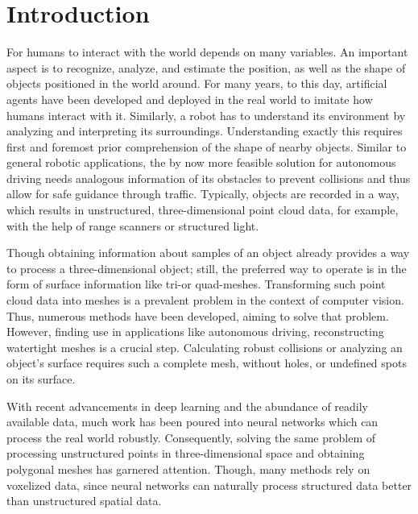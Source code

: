 
\chapter{Introduction}
  For humans to interact with the world depends on many variables. 
  An important aspect is to recognize, analyze, and estimate the position,
  as well as the shape of objects positioned in the world around. For many years,
  to this day, artificial agents have been developed and deployed in the real world\cite{1087032,10.1007978-981-13-0224-4_40} 
  to imitate how humans interact with it. Similarly, a robot has to understand its environment
  by analyzing and interpreting its surroundings. Understanding exactly this requires first and 
  foremost prior comprehension of the shape of nearby objects. 
  Similar to general robotic applications, the by now more feasible solution for autonomous driving
  needs analogous information of its obstacles to prevent collisions and thus allow for safe guidance
  through traffic. 
  Typically, objects are recorded in a way, which results in unstructured, three-dimensional point
  cloud data, for example, with the help of range scanners or structured light.


  Though obtaining information about samples of an object already provides a way to process a three-dimensional object;
  still, the preferred way to operate is in the form of surface information like tri-or quad-meshes.
  Transforming such point cloud data into meshes is a prevalent problem in the context of computer vision. Thus, numerous
  methods have been developed, aiming to solve that problem\cite{817351,Jakob2015Instant}.
  However, finding use in applications like autonomous driving, reconstructing watertight meshes is a crucial step. Calculating robust collisions or
  analyzing an object's surface requires such a complete mesh, without holes, or undefined spots on its surface.

  With recent advancements in deep learning and the abundance of readily available data, much work has been poured
  into neural networks which can process the real world robustly. Consequently, solving the same problem of processing 
  unstructured points in three-dimensional space and obtaining polygonal meshes has garnered attention. Though, many methods 
  rely on voxelized data, since neural networks can naturally process structured data better than unstructured spatial data.

